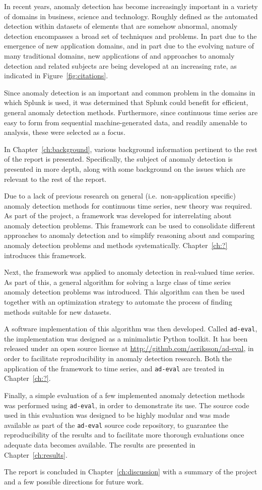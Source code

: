 In recent years, anomaly detection has become increasingly important in a variety of domains in business, science and technology. Roughly defined as the automated detection within datasets of elements that are somehow abnormal, anomaly detection encompasses a broad set of techniques and problems. In part due to the emergence of new application domains, and in part due to the evolving nature of many traditional domains, new applications of and approaches to anomaly detection and related subjects are being developed at an increasing rate, as indicated in Figure~\ref{fig:citations}.

Since anomaly detection is an important and common problem in the domains in which Splunk is used, it was determined that Splunk could benefit for efficient, general anomaly detection methods. Furthermore, since continuous time series are easy to form from sequential machine-generated data, and readily amenable to analysis, these were selected as a focus.

In Chapter~\ref{ch:background}, various background information pertinent to the rest of the report is presented. Specifically, the subject of anomaly detection is presented in more depth, along with some background on the issues which are relevant to the rest of the report.

Due to a lack of previous research on general (i.e.\ non-application specific) anomaly detection methods for continuous time series, new theory was required. As part of the project, a framework was developed for interrelating about anomaly detection problems. This framework can be used to consolidate different approaches to anomaly detection and to simplify reasoning about and comparing anomaly detection problems and methods systematically. Chapter~\ref{ch:?} introduces this framework.

Next, the framework was applied to anomaly detection in real-valued time series. As part of this, a general algorithm for solving a large class of time series anomaly detection problems was introduced. This algorithm can then be used together with an optimization strategy to automate the process of finding methods suitable for new datasets.

A software implementation of this algorithm was then developed. Called \texttt{ad-eval}, the implementation was designed as a minimalistic Python toolkit. It has been released under an open source license at \url{http://github.com/aeriksson/ad-eval}, in order to facilitate reproducibility in anomaly detection research. Both the application of the framework to time series, and \texttt{ad-eval} are treated in Chapter~\ref{ch:?}.

Finally, a simple evaluation of a few implemented anomaly detection methods was performed using \texttt{ad-eval}, in order to demonstrate its use. The source code used in this evaluation was designed to be highly modular and was made available as part of the \texttt{ad-eval} source code repository, to guarantee the reproducibility of the results and to facilitate more thorough evaluations once adequate data becomes available. The results are presented in Chapter~\ref{ch:results}.

The report is concluded in Chapter~\ref{ch:discussion} with a summary of the project and a few possible directions for future work.
